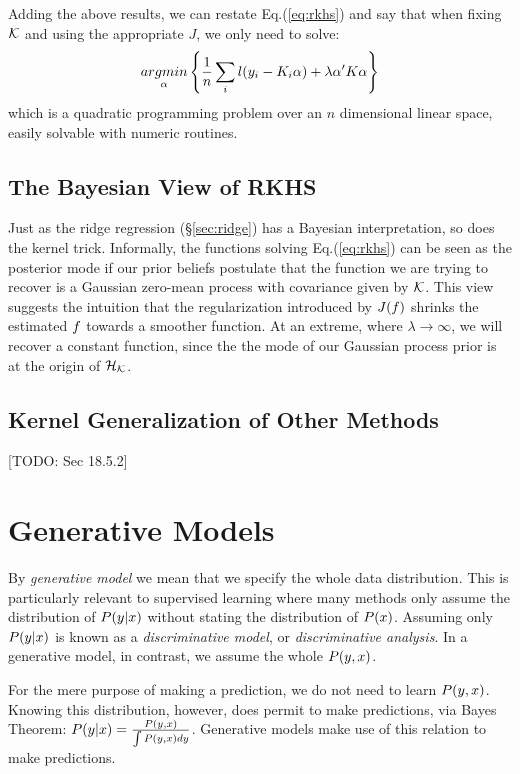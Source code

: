 Adding the above results, we can restate Eq.(\ref{eq:rkhs}) and say that when fixing $\mathcal{K}$ and using the appropriate $J$, we only need to solve: 
\begin{align}	
\label{eq:rkhs_simple}
		\mathop{argmin} _{\alpha}\left\{ \frac{1}{n} \sum_i l(y_i-K_i \alpha) + \lambda \alpha' K \alpha  \right\}
\end{align}
which is a quadratic programming problem over an $n$ dimensional linear space, easily solvable with numeric routines.


\section{The Bayesian View of RKHS}
Just as the ridge regression (\S\ref{sec:ridge}) has a Bayesian interpretation, so does the kernel trick.
Informally, the functions solving Eq.(\ref{eq:rkhs}) can be seen as the posterior mode if our prior beliefs postulate that the function we are trying to recover is a Gaussian zero-mean process with covariance given by $\mathcal{K}$.
This view suggests the intuition that the regularization introduced by $J(f)$ shrinks the estimated $f$ towards a smoother function. At an extreme, where $\lambda\to\infty$, we will recover a constant function, since the the mode of our Gaussian process prior is at the origin of $\mathcal{H}_{\mathcal{K}}$.


\section{Kernel Generalization of Other Methods}
[TODO: Sec 18.5.2]


\chapter{Generative Models}
\label{apx:generative_concept}

By \emph{generative model} we mean that we specify the whole data distribution. This is particularly relevant to supervised learning where many methods only assume the distribution of $P(y|x)$ without stating the distribution of $P(x)$.
Assuming only $P(y|x)$ is known as a \emph{discriminative model}, or \emph{discriminative analysis}.
In a generative model, in contrast, we assume the whole $P(y,x)$.

For the mere purpose of making a prediction, we do not need to learn $P(y,x)$. 
Knowing this distribution, however, does permit to make predictions, via Bayes Theorem: 
$P(y|x)=\frac{P(y,x)}{\int P(y,x)dy}$.
Generative models make use of this relation to make predictions. 


